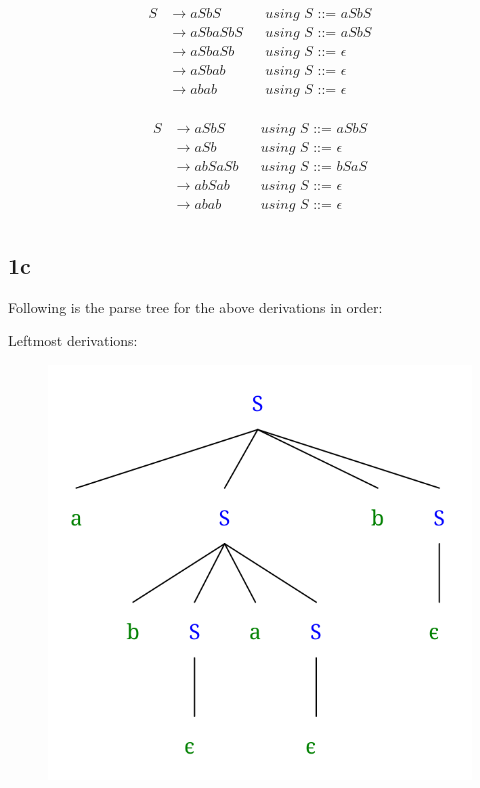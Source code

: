 \documentclass{article}
\begin{document}
    \begin{align*}
        S   & \rightarrow aSbS      && \textit{using S ::= aSbS} \\
            & \rightarrow aSbaSbS   && \textit{using S ::= aSbS} \\
            & \rightarrow aSbaSb    && \textit{using S ::= $\epsilon$} \\
            & \rightarrow aSbab     && \textit{using S ::= $\epsilon$} \\
            & \rightarrow abab      && \textit{using S ::= $\epsilon$} \\
    \end{align*}

    \begin{align*}
        S   & \rightarrow aSbS      && \textit{using S ::= aSbS} \\
            & \rightarrow aSb       && \textit{using S ::= $\epsilon$} \\
            & \rightarrow abSaSb    && \textit{using S ::= bSaS} \\
            & \rightarrow abSab     && \textit{using S ::= $\epsilon$} \\
            & \rightarrow abab      && \textit{using S ::= $\epsilon$} \\
    \end{align*}

    \subsection*{1c}
    Following is the parse tree for the above derivations in order:

    Leftmost derivations:
    \begin{figure}[H]
        \centering
        \includegraphics[width=.7\textwidth]{hw2-1c1.png}
    \end{figure}
\end{document}

